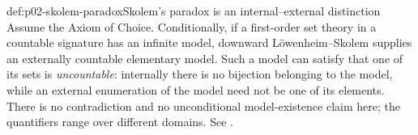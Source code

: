 \begin{hbwarning}{def:p02-skolem-paradox}{Skolem's paradox is an internal--external distinction}
Assume the Axiom of Choice.  Conditionally, if a first-order set theory in a
countable signature has an infinite model, downward L\"owenheim--Skolem
supplies an externally countable elementary model.  Such a model can satisfy
that one of its sets is
\emph{uncountable}: internally there is no bijection belonging to the model,
while an external enumeration of the model need not be one of its elements.
There is no contradiction and no unconditional model-existence claim here;
the quantifiers range over different domains.  See
\cite{Skolem1923SetTheory,Hodges1993}.
\end{hbwarning}
